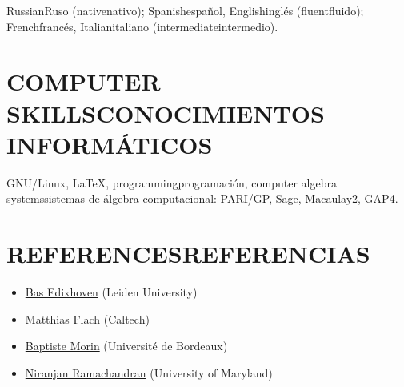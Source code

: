 \documentclass{article}
\newcommand{\biling}[2]{\ifdefined\english#1\fi\ifdefined\spanish#2\fi}
\begin{document}
\biling{Russian}{Ruso} (\biling{native}{nativo});
\biling{Spanish}{español},
\biling{English}{inglés} (\biling{fluent}{fluido});
\biling{French}{francés},
\biling{Italian}{italiano} (\biling{intermediate}{intermedio}).

\vspace{1em}

{\color{RoyalBlue}\section*{\biling{COMPUTER SKILLS}{CONOCIMIENTOS INFORMÁTICOS}}}

GNU/Linux,
LaTeX,
\biling{programming}{programación},
\biling{computer algebra systems}{sistemas de álgebra computacional}:
PARI/GP,
Sage,
Macaulay2,
GAP4.

\vspace{1em}

{\color{RoyalBlue}\section*{\biling{REFERENCES}{REFERENCIAS}}}

\begin{itemize}
\item \href{https://www.math.leidenuniv.nl/~edix/}{Bas Edixhoven} (Leiden University)
\item \href{http://www.math.caltech.edu/~flach/}{Matthias Flach} (Caltech)
\item \href{https://www.math.u-bordeaux.fr/~bmorin/}{Baptiste Morin} (Université de Bordeaux)
\item \href{https://www.math.umd.edu/~atma/}{Niranjan Ramachandran} (University of Maryland)
\end{itemize}
\end{document}
